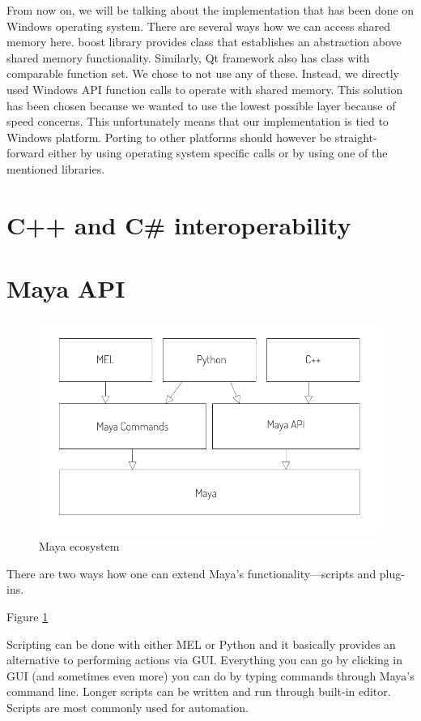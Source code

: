 \documentclass[
  digital, %
  table,   %
  nolof,     %
  nolot,     %
]{fithesis3}
\begin{document}
From now on, we will be talking about the implementation that has been done on Windows operating system. There are several ways how we can access shared memory here. boost library provides class that establishes an abstraction above shared memory functionality. Similarly, Qt framework also has class with comparable function set. We chose to not use any of these. Instead, we directly used Windows API function calls to operate with shared memory. This solution has been chosen because we wanted to use the lowest possible layer because of speed concerns. This unfortunately means that our implementation is tied to Windows platform. Porting to other platforms should however be straight-forward either by using operating system specific calls or by using one of the mentioned libraries.

\section{C++ and C\# interoperability}

\section{Maya API}
\begin{figure}
  \centering
  \includegraphics[scale=0.8]{images/maya-ecosystem.pdf}
  \caption{Maya ecosystem}
  \label{fig:maya-ecosystem}
\end{figure}

There are two ways how one can extend Maya's functionality—scripts and plug-ins.

Figure \ref{fig:maya-ecosystem}

Scripting can be done with either MEL or Python and it basically provides an alternative to performing actions via GUI. Everything you can go by clicking in GUI (and sometimes even more) you can do by typing commands through Maya's command line. Longer scripts can be written and run through built-in editor. Scripts are most commonly used for automation.
\end{document}
